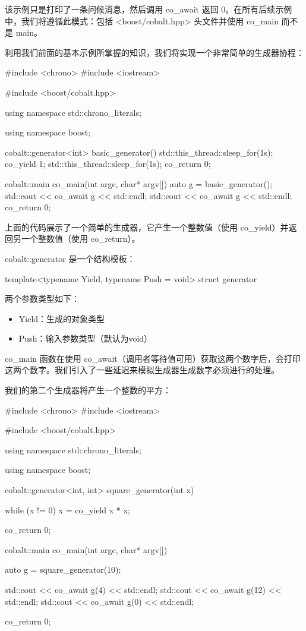 该示例只是打印了一条问候消息，然后调用 co\_await 返回 0。在所有后续示例中，我们将遵循此模式：包括 <boost/cobalt.hpp> 头文件并使用 co\_main 而不是 main。


利用我们前面的基本示例所掌握的知识，我们将实现一个非常简单的生成器协程：

\begin{cpp}
#include <chrono>
#include <iostream>

#include <boost/cobalt.hpp>

using namespace std::chrono_literals;

using namespace boost;

cobalt::generator<int> basic_generator()
{
    std::this_thread::sleep_for(1s);
    co_yield 1;
    std::this_thread::sleep_for(1s);
    co_return 0;
}

cobalt::main co_main(int argc, char* argv[]) {
    auto g = basic_generator();
    std::cout << co_await g << std::endl;
    std::cout << co_await g << std::endl;
    co_return 0;
}
\end{cpp}

上面的代码展示了一个简单的生成器，它产生一个整数值（使用 co\_yield）并返回另一个整数值（使用 co\_return）。

cobalt::generator 是一个结构模板：

\begin{cpp}
template<typename Yield, typename Push = void>
struct generator
\end{cpp}

两个参数类型如下：

\begin{itemize}
\item
Yield：生成的对象类型

\item
Push：输入参数类型（默认为void）
\end{itemize}

co\_main 函数在使用 co\_await（调用者等待值可用）获取这两个数字后，会打印这两个数字。我们引入了一些延迟来模拟生成器生成数字必须进行的处理。

我们的第二个生成器将产生一个整数的平方：

\begin{cpp}
#include <chrono>
#include <iostream>

#include <boost/cobalt.hpp>

using namespace std::chrono_literals;

using namespace boost;

cobalt::generator<int, int> square_generator(int x){
    while (x != 0) {
        x = co_yield x * x;
    }

    co_return 0;
}

cobalt::main co_main(int argc, char* argv[]){
    auto g = square_generator(10);

    std::cout << co_await g(4) << std::endl;
    std::cout << co_await g(12) << std::endl;
    std::cout << co_await g(0) << std::endl;

    co_return 0;
}
\end{cpp}


